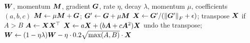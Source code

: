 \begin{algorithm}[t]
\caption{One Muon step for a weight matrix $\mW \in \R^{A\times B}$ (quintic Newton--Schulz, $n_{\mathrm{ns}}$ iterations).}\label{alg:c01-muon}
\begin{algorithmic}[1]
\Require $\bm{W}$, momentum $\bm{M}$, gradient $\bm{G}$, rate $\eta$, decay $\lambda$, momentum $\mu$, coefficients $(a, b, c)$
\State $\bm{M} \gets \mu\bm{M} + \bm{G}$; \quad $\bm{G}' \gets \bm{G} + \mu\bm{M}$ 
\State $\bm{X} \gets \bm{G}'/(\left\lVert \bm{G}'\right\rVert_F + \epsilon)$; transpose $\bm{X}$ if $A > B$ 
  \State $\bm{A} \gets \bm{X}\bm{X}^{\top}$ 
  \State $\bm{X} \gets a\bm{X} + (b\bm{A} + c\bm{A}^2)\bm{X}$
\EndFor
\State undo the transpose; $\bm{W} \gets (1-\eta\lambda)\bm{W} - \eta\cdot 0.2\sqrt{\max(A,B)}\cdot\bm{X}$
\end{algorithmic}
\end{algorithm}


